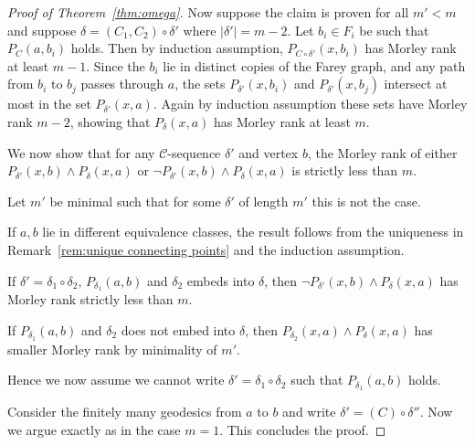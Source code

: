 \documentclass[10pt,a4paper]{amsart}
\newcommand{\C}{\mathcal{C}}
\renewcommand{\d}{\delta}
\begin{document}
\begin{proof}[Proof of Theorem~\ref{thm:omega}]
Now suppose the claim is proven for all $m'<m$ and suppose $\d=(C_1,C_2)\circ\d'$ where $|\d'|=m-2$. Let $b_i\in F_i$ be such that $P_C(a,b_i)$ holds. Then by induction assumption, $P_{C\circ \d'}(x,b_i)$ has Morley rank at least $m-1$. Since the $b_i$ lie in distinct copies of the Farey graph, and any path from $b_i$ to $b_j$ passes through $a$, the sets $P_{\d'}(x,b_i)$ and $P_{\d'}(x,b_j)$ intersect at most in the set $P_{\d'}(x,a)$. Again by induction assumption these sets have Morley rank $m-2$, showing that $P_\d(x,a)$ has Morley rank at least $m$.


We now show that for any $\C$-sequence $\d'$ and vertex $b$, the Morley rank of either $P_{\d'}(x,b)\wedge P_\d(x,a)$ or  $\neg P_{\d'}(x,b)\wedge P_\d(x,a)$ is strictly less than $m$. 

 
Let $m'$ be minimal such that for some $\d'$ of length $m'$  this is not the case.

If $a,b$ lie in different equivalence classes, the result follows from the uniqueness in Remark~\ref{rem:unique connecting points} and the induction assumption.



If $\d'=\d_1\circ\d_2$, $P_{\d_1}(a,b)$ and $\d_2$ embeds into $\d$, then  $\neg P_{\d'}(x,b)\wedge P_\d(x,a)$ has Morley rank strictly less than $m$.



If $P_{\d_1}(a,b)$ and $\d_2$ does not embed into $\d$, then $P_{\d_2}(x,a)\wedge P_\d(x,a)$ has smaller Morley rank by minimality of $m'$. 

Hence we now assume we cannot write $\d'=\d_1\circ\d_2$ such that $P_{\d_1}(a,b)$ holds.

Consider the finitely many geodesics from $a$ to $b$ and write $\d'=(C)\circ\d''$. Now we argue exactly as in the case $m=1$. This concludes the proof.
\end{proof}
\end{document}
